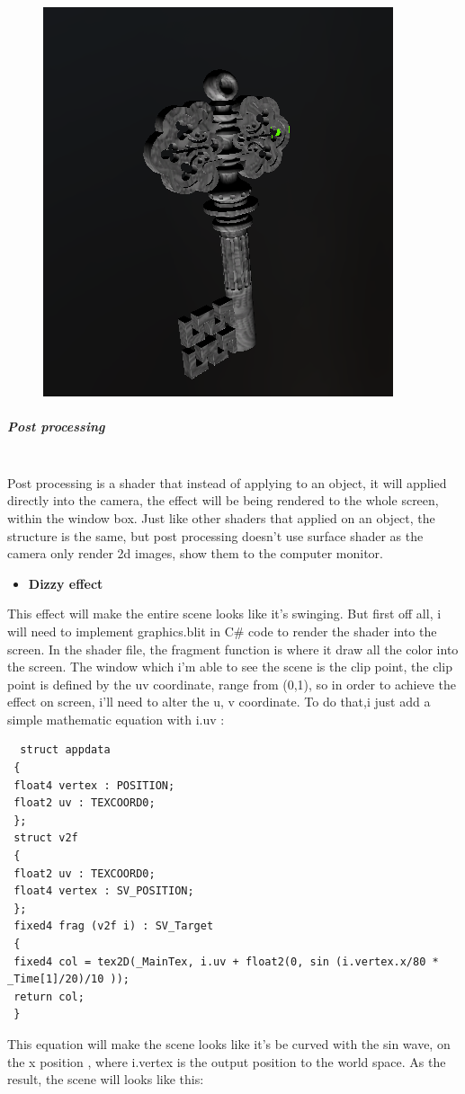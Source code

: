 \documentclass[a4paper, 13pt]{extarticle}
\begin{document}
{\begin{figure}[h]
			\begin{minipage}{1\textwidth}
				\centering
				\includegraphics[width=0.3\linewidth]{intructions/light_react.png}
				\centering
			\end{minipage}
	\end{figure}
\subparagraph{Post processing} ~\\
Post processing is a shader that instead of applying to an object, it will applied directly into the camera, the effect will be being rendered to the whole screen, within the window box. Just like other shaders that applied on an object, the structure is the same, but post processing doesn't use surface shader as the camera only render 2d images, show them to the computer monitor.
\begin{itemize}
	\item \bfseries Dizzy effect 
\end{itemize} 
 This effect will make the entire scene looks like it's swinging. But first off all, i will need to implement graphics.blit in C\# code to render the shader into the screen. In the shader file, the fragment function is where it draw all the color into the screen. The window which i'm able to see the scene is the clip point, the clip point is defined by the uv coordinate, range from (0,1), so in order to achieve the effect on screen, i'll need to alter the u, v coordinate. To do that,i just add a simple mathematic equation with i.uv : 
 \begin{lstlisting}
  struct appdata
 {
 float4 vertex : POSITION;
 float2 uv : TEXCOORD0;
 };
 struct v2f
 {
 float2 uv : TEXCOORD0;
 float4 vertex : SV_POSITION;
 };
 fixed4 frag (v2f i) : SV_Target
 {
 fixed4 col = tex2D(_MainTex, i.uv + float2(0, sin (i.vertex.x/80 * _Time[1]/20)/10 ));
 return col;
 }
 \end{lstlisting} 
 This equation will make the scene looks like it's be curved with the sin wave, on the x position , where i.vertex is the output position to the world space. As the result, the scene will looks like this: 
 \newpage
 ~
 \begin{figure}[h] 

\end{figure}}
\end{document}
